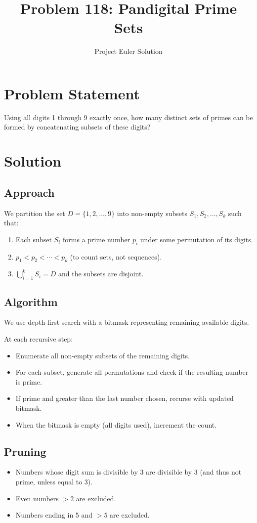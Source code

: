 \documentclass[12pt]{article}
\title{Problem 118: Pandigital Prime Sets}
\author{Project Euler Solution}
\date{}
\begin{document}
\maketitle

\section{Problem Statement}
Using all digits 1 through 9 exactly once, how many distinct sets of primes can be formed by concatenating subsets of these digits?

\section{Solution}

\subsection{Approach}
We partition the set $D = \{1, 2, \ldots, 9\}$ into non-empty subsets $S_1, S_2, \ldots, S_k$ such that:
\begin{enumerate}
\item Each subset $S_i$ forms a prime number $p_i$ under some permutation of its digits.
\item $p_1 < p_2 < \cdots < p_k$ (to count sets, not sequences).
\item $\bigcup_{i=1}^k S_i = D$ and the subsets are disjoint.
\end{enumerate}

\subsection{Algorithm}
We use depth-first search with a bitmask representing remaining available digits.

At each recursive step:
\begin{itemize}
\item Enumerate all non-empty subsets of the remaining digits.
\item For each subset, generate all permutations and check if the resulting number is prime.
\item If prime and greater than the last number chosen, recurse with updated bitmask.
\item When the bitmask is empty (all digits used), increment the count.
\end{itemize}

\subsection{Pruning}
\begin{itemize}
\item Numbers whose digit sum is divisible by 3 are divisible by 3 (and thus not prime, unless equal to 3).
\item Even numbers $> 2$ are excluded.
\item Numbers ending in 5 and $> 5$ are excluded.
\end{itemize}
\end{document}
